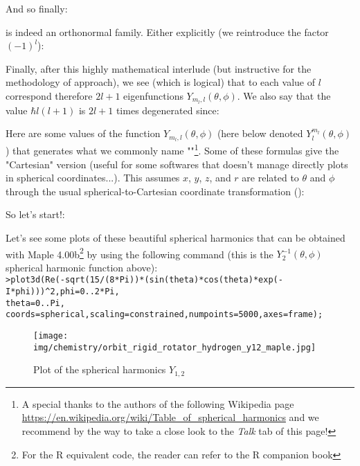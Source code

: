 	And so finally:
	
	is indeed an orthonormal family. Either explicitly (we reintroduce the factor $(-1)^l$):
	
	Finally, after this highly mathematical interlude (but instructive for the methodology of approach), we see (which is logical) that to each value of $l$ correspond therefore $2l + 1$ eigenfunctions $Y_{m_l,l}(\theta,\phi)$. We also say that the value $\hbar l(l+1)$ is $2l + 1$ times degenerated since:
	
	Here are some values of the function  $Y_{m_l,l}(\theta,\phi)$ (here below denoted $Y_{l}^{m_l}(\theta,\phi)$) that generates what we commonly name ""\footnote{A special thanks to the authors of the following Wikipedia page \url{https://en.wikipedia.org/wiki/Table_of_spherical_harmonics} and we recommend by the way to take a close look to the \textit{Talk} tab of this page!}. Some of these formulas give the "Cartesian" version (useful for some softwares that doesn't manage directly plots in spherical coordinates...). This assumes $x$, $y$, $z$, and $r$ are related to $\theta$  and $\phi$ through the usual spherical-to-Cartesian coordinate transformation ():
	
	So let's start!:
	
	
	
	
	
	
	
	
	
	
	
	
	Let's see some plots of these beautiful spherical harmonics that can be obtained with Maple 4.00b\footnote{For the R equivalent code, the reader can refer to the R companion book} by using the following command (this is the $Y_2^{-1}(\theta,\phi)$ spherical harmonic function above):\\

	\texttt{>plot3d(Re(-sqrt(15/(8*Pi))*(sin(theta)*cos(theta)*exp(-I*phi)))\string^2,phi=0..2*Pi,\\theta=0..Pi, coords=spherical,scaling=constrained,numpoints=5000,axes=frame);}
	\begin{figure}[H]
		\centering
		\texttt{[image: img/chemistry/orbit\_rigid\_rotator\_hydrogen\_y12\_maple.jpg]}	
		\caption{Plot of the spherical harmonics $Y_{1,2}$}
	\end{figure}
	
